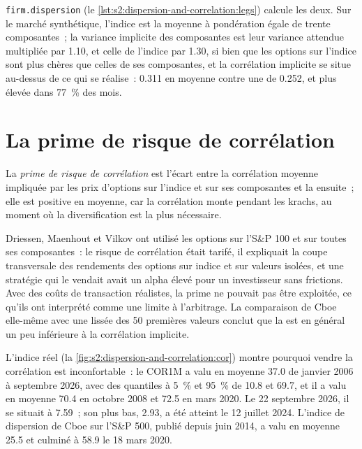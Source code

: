 \texttt{firm.dispersion} (le \cref{lst:s2:dispersion-and-correlation:legs}) calcule les deux. Sur le marché synthétique, l'indice est la moyenne à pondération égale de
trente composantes~; la variance implicite des composantes est leur variance attendue multipliée par 1.10, et celle de l'indice par 1.30, si bien que les options sur l'indice sont plus chères
que celles de ses composantes, et la corrélation implicite se situe au-dessus de ce qui se réalise~: 0.311 en moyenne contre une  de 0.252, et plus élevée dans 77~\% des mois.

\section{La prime de risque de corrélation}

\begin{definition}\label{def:s2:dispersion-and-correlation:premium}
La \emph{prime de risque de corrélation} est l'écart entre la corrélation moyenne impliquée par les prix d'options sur l'indice et sur ses
composantes et la  ensuite~; elle est positive en moyenne, car la corrélation monte pendant les krachs, au moment où la diversification est la plus nécessaire.
\end{definition}

Driessen, Maenhout et Vilkov ont utilisé les options sur l'S\&P 100 et sur toutes ses composantes~: le risque de corrélation était tarifé, il expliquait la
coupe transversale des rendements des options sur indice et sur valeurs isolées, et une stratégie qui le vendait avait un alpha élevé pour un investisseur sans frictions. Avec des coûts de transaction réalistes, la
prime ne pouvait pas être exploitée, ce qu'ils ont interprété comme une limite à l'arbitrage. La comparaison de Cboe elle-même avec une  lissée
des 50 premières valeurs conclut que la  est en général un peu inférieure à la corrélation implicite.

L'indice réel (la \cref{fig:s2:dispersion-and-correlation:cor}) montre pourquoi vendre la corrélation est inconfortable~: le COR1M a valu en moyenne 37.0 de janvier 2006 à
septembre 2026, avec des quantiles à 5~\% et 95~\% de 10.8 et 69.7, et il a valu en moyenne 70.4 en octobre 2008 et 72.5 en mars 2020. Le 22 septembre 2026, il se situait à
7.59~; son plus bas, 2.93, a été atteint le 12 juillet 2024. L'indice de dispersion de Cboe sur l'S\&P 500, publié depuis
juin 2014, a valu en moyenne 25.5 et culminé à 58.9 le 18 mars 2020.

